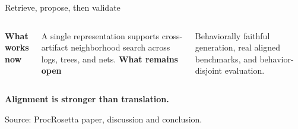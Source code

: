\documentclass[aspectratio=169,12pt]{beamer}
\newcommand{\source}[1]{\vfill{\tiny\color{prgray}Source: #1\par}}
\begin{document}
\begin{frame}[t]{Retrieve, propose, then validate}
  \vspace{5mm}
  \begin{center}
  \end{center}
  \vspace{6mm}
  \begin{columns}[T,onlytextwidth]
      \textbf{What works now}\par
      \small A single representation supports cross-artifact neighborhood search across logs, trees, and nets.
      \textbf{What remains open}\par
      \small Behaviorally faithful generation, real aligned benchmarks, and behavior-disjoint evaluation.
  \end{columns}
  \vspace{5mm}
  \begin{center}
    \Large\bfseries\color{prnavy}Alignment is stronger than translation.
  \end{center}
  \source{ProcRosetta paper, discussion and conclusion.}
\end{frame}

\appendix
\end{document}
